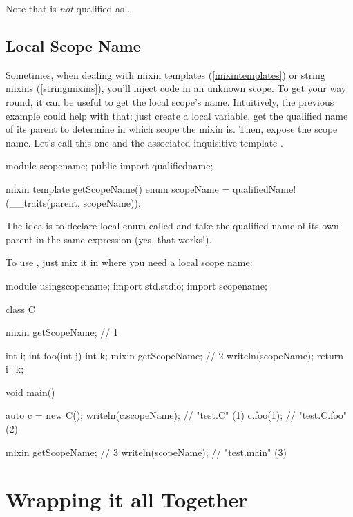 Note that  is \emph{not} qualified as .

\subsection{Local Scope Name}

Sometimes, when dealing with mixin templates (\ref{mixintemplates}) or string mixins (\ref{stringmixins}), you'll inject code in an unknown scope. To get your way round, it can be useful to get the local scope's name. Intuitively, the previous example could help with that: just create a local variable, get the qualified name of its parent to determine in which scope the mixin is. Then, expose the scope name. Let's call this one  and the associated inquisitive template .

\begin{dcode}
module scopename;
public import qualifiedname;

mixin template getScopeName()
{
    enum scopeName = qualifiedName!(__traits(parent, scopeName));
}
\end{dcode}

The idea is to declare local enum called  and take the qualified name of its own parent in the same expression (yes, that works!).

To use , just mix it in where you need a local scope name:

\begin{dcode}
module usingscopename;
import std.stdio;
import scopename;

class C
{
    mixin getScopeName; // 1
    
    int i;
    int foo(int j)
    {
        int k;
        mixin getScopeName; // 2
        writeln(scopeName);
        return i+k;
    }    
}

void main()
{
    auto c = new C();
    writeln(c.scopeName); // "test.C" (1)
    c.foo(1);             // "test.C.foo" (2)
    
    mixin getScopeName; // 3
    writeln(scopeName);   // "test.main" (3)
}
\end{dcode}

\section{Wrapping it all Together}\label{wrappingitup}

